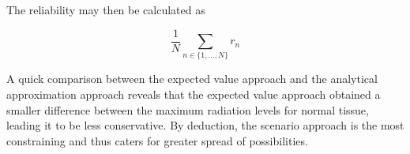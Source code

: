\documentclass[a4paper,11pt]{article}
\begin{document}
\vspace{12pt}

The reliability may then be calculated as

\begin{equation}
	\frac{1}{N}	\sum_{n\in \{1,\dots,N\}} r_n
\end{equation}

A quick comparison between the expected value approach and the analytical approximation approach reveals that the expected value approach obtained a smaller difference between the maximum radiation levels for normal tissue, leading it to be less conservative. By deduction, the scenario approach is the most constraining and thus caters for greater spread of possibilities.
\end{document}
